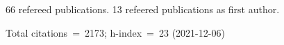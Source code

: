 66 refereed publications. 13 refeered publications as first author.

Total citations~=~2173; h-index~=~23 (2021-12-06)